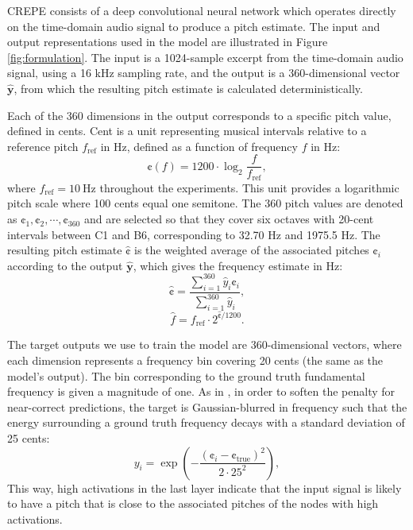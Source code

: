 CREPE consists of a deep convolutional neural network which operates directly on the time-domain audio signal to produce a pitch estimate.
The input and output representations used in the model are illustrated in Figure \ref{fig:formulation}.
The input is a 1024-sample excerpt from the time-domain audio signal, using a 16 kHz sampling rate, and the output is a 360-dimensional vector $\hat{\mathbf{y}}$, from which the resulting pitch estimate is calculated deterministically.

Each of the 360 dimensions in the output corresponds to a specific pitch value, defined in cents.
Cent is a unit representing musical intervals relative to a reference pitch $f_{\mathrm{ref}}$ in Hz, defined as a function of frequency $f$ in Hz:
\begin{equation}
\cent(f) = 1200 \cdot \log_2 \frac{f}{f_{\mathrm{ref}}},
\end{equation}
where $f_{\mathrm{ref}} = 10 \mathrm{~Hz}$ throughout the experiments. 
This unit provides a logarithmic pitch scale where 100 cents equal one semitone.
The 360 pitch values are denoted as $\cent_1, \cent_2, \cdots, \cent_{360}$ and are selected so that they cover six octaves with 20-cent intervals between C1 and B6, corresponding to 32.70 Hz and 1975.5 Hz. 
The resulting pitch estimate $\hat{\cent}$ is the weighted average of the associated pitches $\cent_i$ according to the output $\hat{\mathbf{y}}$, which gives the frequency estimate in Hz:
\begin{equation}\label{eqn:resulting}
\hat{\cent} = \frac{\sum_{i=1}^{360}\hat{y}_i \cent_i}{\sum_{i=1}^{360} \hat{y}_i},
\end{equation}
\begin{equation}\label{eqn:resulting2}
\hat{f} = f_{\mathrm{ref}} \cdot 2 ^ {\hat{\cent} / 1200}.
\end{equation}

The target outputs we use to train the model are 360-dimensional vectors, where each dimension represents a frequency bin covering 20 cents (the same as the model's output).
The bin corresponding to the ground truth fundamental frequency is given a magnitude of one.
As in \cite{bittner2017deepsalience}, in order to soften the penalty for near-correct predictions, the target is Gaussian-blurred in frequency such that the energy surrounding a ground truth frequency decays with a standard deviation of 25 cents:
\begin{equation}\label{eqn:gaussian}
y_i = \exp \left ( {-\frac{(\cent_i - \cent_{\mathrm{true}})^2}{2 \cdot 25^2}} \right ),
\end{equation}
This way, high activations in the last layer indicate that the input signal is likely to have a pitch that is close to the associated pitches of the nodes with high activations.

